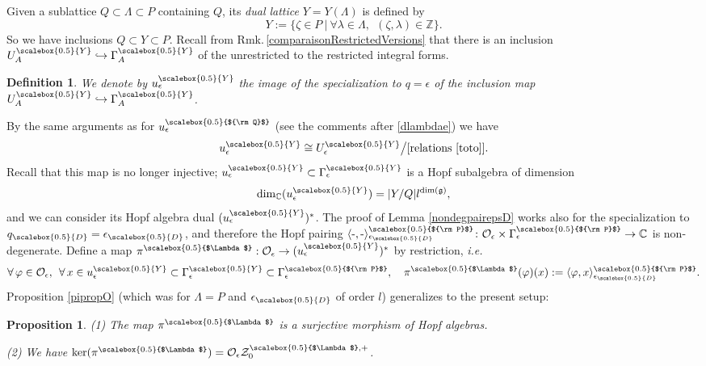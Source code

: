 \documentclass[11pt]{amsart}
\newtheorem{prop}[teo]{Proposition}
\newtheorem{defi}[teo]{Definition}
\newcommand{\e}{\epsilon}
\newcommand{\mc}{\mathbb{C}}
\newcommand{\mz}{\mathbb{Z}}
\newcommand{\qD}{q_{\scalebox{0.5}{D}}}
\newcommand{\eD}{\epsilon_{\scalebox{0.5}{D}}}
\newcommand{\Q}{{\scalebox{0.5}{${\rm Q}$}}}
\newcommand{\Y}{{\scalebox{0.5}{Y}}}
\newcommand{\Pup}{{\scalebox{0.5}{${\rm P}$}}}
\newcommand{\Lam}{{\scalebox{0.5}{$\Lambda$}}}
\begin{document}
Given a sublattice $Q \subset \Lambda \subset P$ containing $Q$, its {\em dual lattice} $Y=Y(\Lambda)$ is defined by
\begin{equation}\label{duallatticesept25}
Y := \{\zeta\in P \: \vert \: \forall \lambda\in \Lambda, \:\: (\zeta,\lambda) \in \mz\}.
\end{equation}
So we have inclusions $Q \subset Y \subset P$. Recall from Rmk.\,\ref{comparaisonRestrictedVersions} that there is an inclusion $U_A^\Y \hookrightarrow \Gamma_A^\Y$ of the unrestricted to the restricted integral forms. 
\begin{defi}\label{defueY} We denote by $u_\e^\Y$ the image of the specialization to $q=\e$ of the inclusion map $U_A^\Y \hookrightarrow \Gamma_A^\Y$.
\end{defi}
By the same arguments as for $u_\e^\Q$ (see the comments after \eqref{dlambdae}) we have 
\begin{equation}\label{reltotouY} u_\e^\Y  \cong U_{\epsilon}^\Y\big/[{\rm relations}\ \eqref{toto}].
\end{equation}
Recall that this map is no longer injective; $u_\e^\Y\subset \Gamma_\e^\Y$ is a Hopf subalgebra of dimension
\begin{equation}\label{dimuYmars26}{\rm dim}_\mc(u_\e^\Y) = |Y/Q|l^{\dim(\mathfrak{g})},
\end{equation}
and we can consider its Hopf algebra dual $(u_\epsilon^\Y)^{*}$. The proof of Lemma \ref{nondegpairepsD} works also for the specialization to $\qD=\eD$, and therefore the Hopf pairing $\langle \text{-},\text{-} \rangle_{\eD}^\Pup \colon {\mathcal O}_\e\times \Gamma_\e^\Pup \to \mc$ is non-degenerate. Define a map $\pi^\Lam: {\mathcal O}_\epsilon \rightarrow (u_\epsilon^\Y)^{*}$ by  restriction, {\it i.e.}
\begin{equation}\label{piLamdef}
\forall \, \varphi \in \mathcal{O}_\epsilon, \:\: \forall \, x\in u_\epsilon^\Y \subset \Gamma_\epsilon^\Y \subset \Gamma_\e^\Pup, \quad \pi^\Lam(\varphi)(x):=\langle \varphi,x\rangle_{\eD}^\Pup.
\end{equation}
Proposition \ref{pipropO} (which was for $\Lambda = P$ and $\eD$ of order $l$) generalizes to the present setup:
\begin{prop}\label{pipropOLam}
(1) The map $\pi^\Lam$ is a surjective morphism of Hopf algebras.

\noindent (2) We have  $\ker(\pi^\Lam)={\mathcal O}_\epsilon \mathcal{Z}_{0}^{\Lam,+}$.
\end{prop}
\end{document}

